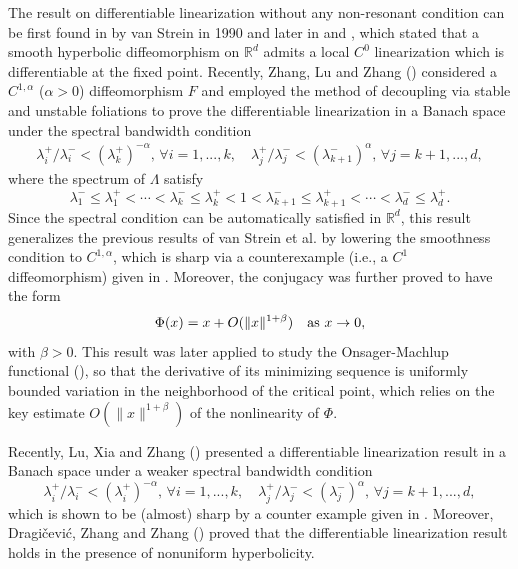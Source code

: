 \documentclass[reqno]{amsart}
\numberwithin{equation}{section}
\begin{document}
The result on differentiable linearization without any non-resonant condition can be first found in \cite{vS-JDE} by van Strein in 1990 and later in \cite{Ray-JDE} and \cite{GHR-DCDS},
which stated that a smooth hyperbolic diffeomorphism on $\mathbb{R}^d$ admits a local $C^0$ linearization which is differentiable at the fixed point.
Recently, Zhang, Lu and Zhang (\cite{ZLZ-TAMS}) considered a $C^{1,\alpha}$ ($\alpha>0$) diffeomorphism $F$ and employed the method of decoupling via stable and unstable foliations to prove the differentiable linearization in a
Banach space under the spectral bandwidth condition
\begin{align*}%
\lambda_i^+/\lambda_i^- < (\lambda_k^+)^{-\alpha}, \, \forall i=1,...,k, \quad \lambda_j^+/\lambda_j^- < (\lambda_{k+1}^-)^{\alpha}, \, \forall j=k+1,...,d,
\end{align*}
where the spectrum of $\Lambda$ satisfy
$$
\lambda_1^-\le \lambda_1^+<\cdots <\lambda_k^- \le \lambda_k^+ <1 < \lambda_{k+1}^- \le \lambda_{k+1}^+ < \cdots < \lambda_d^- \le \lambda_d^+.
$$
Since the spectral condition can be automatically satisfied in $\mathbb{R}^d$, this result generalizes the previous results of van Strein et al. by lowering the smoothness condition to $C^{1,\alpha}$, which is sharp via a counterexample (i.e., a $C^1$ diffeomorphism) given in \cite{ZLZ-TAMS}. Moreover, the conjugacy was further proved to have the form
$$
\Phi(x)=x+O(\|x\|^{1+\beta})\quad {\rm as}~x\to 0,
$$
with $\beta>0$. This result was later applied to study the Onsager-Machlup functional (\cite{DLLR-SCM}),
so that the derivative of its minimizing sequence is uniformly bounded variation in the neighborhood of the critical point, which relies on the key estimate $O(\|x\|^{1+\beta})$ of the nonlinearity of $\Phi$.




Recently,
Lu, Xia and Zhang (\cite{LXZ-pre}) presented a differentiable linearization result in a Banach space
under a weaker spectral bandwidth condition
$$
\lambda_i^+/\lambda_i^- < (\lambda_i^+)^{-\alpha}, \, \forall i=1,...,k, \quad \lambda_j^+/\lambda_j^- < (\lambda_{j}^-)^{\alpha}, \, \forall j=k+1,...,d,
$$
which is shown to be (almost) sharp by a counter example given in \cite{RS-Prob}.
Moreover, Dragi\v{c}evi\'{c}, Zhang and Zhang (\cite{DZZ-PLMS}) proved that the differentiable linearization result holds in the presence of nonuniform hyperbolicity.
\end{document}
